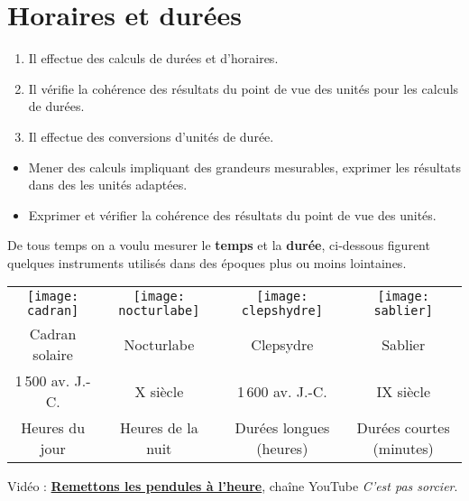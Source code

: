 \themaM
\graphicspath{{../../S07_Horaires_et_durees/Images}}

\chapter{Horaires et durées}
\label{S07}


\begin{autoeval}
   \small
   \begin{enumerate}
      \item Il effectue des calculs de durées et d'horaires.
      \item Il vérifie la cohérence des résultats du point de vue des unités pour les calculs de durées.
      \item Il effectue des conversions d'unités de durée.
   \end{enumerate}
\end{autoeval}

\begin{prerequis}
   \begin{itemize}
      \item[\com] Mener des calculs impliquant des grandeurs mesurables, exprimer les résultats dans des les unités adaptées.
      \item[\com] Exprimer et vérifier la cohérence des résultats du point de vue des unités.
   \end{itemize}
\end{prerequis}

\vfill


\begin{debat}
   De tous temps on a voulu mesurer le {\bf temps} et la {\bf durée}, ci-dessous figurent quelques instruments utilisés dans des époques plus ou moins lointaines. \\
   \textcolor{B1}{\small
   \begin{tabular}{*{4}{C{3.5}}}
      \texttt{[image: cadran]}
      &
      \texttt{[image: nocturlabe]}
      &
      \texttt{[image: clepshydre]}
      &
      \texttt{[image: sablier]} \\
      Cadran solaire & Nocturlabe & Clepsydre & Sablier \\
      1\,500 av. J.-C. & X siècle & 1\,600 av. J.-C. & IX siècle \\
      Heures du jour & Heures de la nuit & Durées longues (heures) & Durées courtes (minutes) \\
   \end{tabular}}
   \bigskip
   \begin{cadre}[B2][F4]
      \begin{center}
         Vidéo : \href{https://www.youtube.com/watch?v=8vMTE9U9z0U}{\bf Remettons les pendules à l'heure}, chaîne YouTube {\it C'est pas sorcier}.
      \end{center}
   \end{cadre}
\end{debat}


